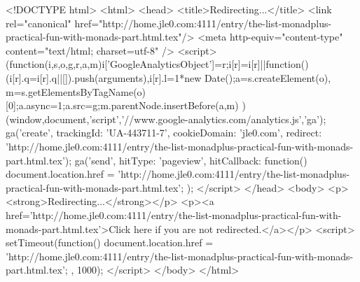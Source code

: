 <!DOCTYPE html>
<html>
<head>
<title>Redirecting...</title>
<link rel="canonical" href="http://home.jle0.com:4111/entry/the-list-monadplus-practical-fun-with-monads-part.html.tex"/>
<meta http-equiv="content-type" content="text/html; charset=utf-8" />
<script>
(function(i,s,o,g,r,a,m){i['GoogleAnalyticsObject']=r;i[r]=i[r]||function(){
(i[r].q=i[r].q||[]).push(arguments)},i[r].l=1*new Date();a=s.createElement(o),
m=s.getElementsByTagName(o)[0];a.async=1;a.src=g;m.parentNode.insertBefore(a,m)
})(window,document,'script','//www.google-analytics.com/analytics.js','ga');
ga('create', { trackingId: 'UA-443711-7', cookieDomain: 'jle0.com', redirect: 'http://home.jle0.com:4111/entry/the-list-monadplus-practical-fun-with-monads-part.html.tex'});
ga('send', { hitType: 'pageview', hitCallback: function() { document.location.href = 'http://home.jle0.com:4111/entry/the-list-monadplus-practical-fun-with-monads-part.html.tex'; } });
</script>
</head>
<body>
  <p><strong>Redirecting...</strong></p>
  <p><a href='http://home.jle0.com:4111/entry/the-list-monadplus-practical-fun-with-monads-part.html.tex'>Click here if you are not redirected.</a></p>
  <script>
    setTimeout(function() { document.location.href = 'http://home.jle0.com:4111/entry/the-list-monadplus-practical-fun-with-monads-part.html.tex'; }, 1000);
  </script>
</body>
</html>
